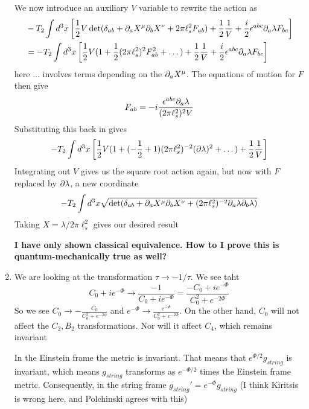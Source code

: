 \documentclass[11pt, class=article, crop=false]{standalone}
\begin{document}
\begin{enumerate}
	We now introduce an auxiliary $V$ variable to rewrite the action as
	\[
	\begin{aligned}
		&-T_2 \int d^3 x \left[\frac12 V \det(\delta_{ab} + \partial_a X^\mu \partial_b X^\nu + 2 \pi \ell_s^2 F_{ab})  + \frac12 \frac1V + \frac{i}{2}\epsilon^{abc} \partial_a \lambda F_{bc} \right]\\
		& = -T_2 \int d^3 x \left[\frac12 V (1 + \frac12 (2\pi \ell_s^2)^2 F_{ab}^2  + \dots ) + \frac12 \frac{1}{V} + \frac{i}{2}\epsilon^{abc} \partial_a \lambda F_{bc} \right]
	\end{aligned}
	\]
	here $\dots$ involves terms depending on the $\partial_a X^\mu$.
	The equations of motion for $F$ then give 
	\[
		F_{ab} = - i \frac{\epsilon^{abc} \partial_a \lambda}{(2 \pi \ell_s^2)^2 V}
	\]
	Substituting this back in gives
	\[
		 -T_2 \int d^3 x  \left[ \frac12 V (1 + (- \frac12 + 1) (2 \pi \ell_s^2)^{-2} (\partial \lambda)^2 + \dots ) + \frac12 \frac{1}{V} \right]
	\]
	Integrating out $V$ gives us the square root action again, but now with $F$ replaced by $\partial \lambda$, a new coordinate 
	\[
		- T_2 \int d^3 x \sqrt{\det (\delta_{ab} +\partial_a X^\mu \partial_b X^\nu +  (2 \pi \ell_s^2)^{-2}  \partial_a \lambda \partial_b \lambda )}
	\]
	Taking $X = \lambda / 2\pi \ell_s^2$ gives our desired result
	
	\textbf{I have only shown classical equivalence. How to I prove this is quantum-mechanically true as well?}
	
	
	\item We are looking at the transformation $\tau \to -1/\tau$. We see taht 
	\[
		C_0 + i e^{- \Phi} \to \frac{-1}{C_0 + i e^{- \Phi}} = \frac{-C_0 + i e^{- \Phi}}{C_0^2 + e^{-2\Phi}}
	\]
	So we see $C_0 \to - \frac{C_0}{C_0^2 + e^{-2\phi}}$ and $e^{-\Phi} \to \frac{e^{-\Phi}}{C_0^2 + e^{-2\Phi}}$. On the other hand, $C_0$ will not affect the $C_2, B_2$ transformations. Nor will it affect $C_4$, which remains invariant
	
	In the Einstein frame the metric is invariant. That means that $e^{\Phi/2} g_{string}$ is invariant, which means $g_{string}$ transforms as $e^{-\Phi/2}$ times the Einstein frame metric. Consequently, in the string frame $g_{string}' = e^{-\Phi} g_{string}$ (I think Kiritsis is wrong here, and Polchinski agrees with this)


\end{enumerate}
\end{document}
